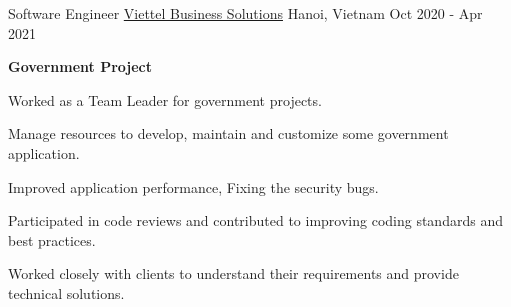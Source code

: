 \begin{cventries}
{\begin{cvitems}
  	\end{cvitems}
  }
  \cventry
  {Software Engineer} %
  {\underline{Viettel Business Solutions}} %
  {Hanoi, Vietnam} %
  {Oct 2020 - Apr 2021} %
  {
  	\begin{cvitems} %
  		\item[ ] {\textbf {Government Project}}
  		\item {Worked as a Team Leader for government projects.}
  		\item {Manage resources to develop, maintain and customize some government application.}
  		\item {Improved application performance, Fixing the security bugs.}
  		\item {Participated in code reviews and contributed to improving coding standards and best practices.}
  		\item {Worked closely with clients to understand their requirements and provide technical solutions.}
  		\item[ ]
  	\end{cvitems}
  }
  

\end{cventries}
